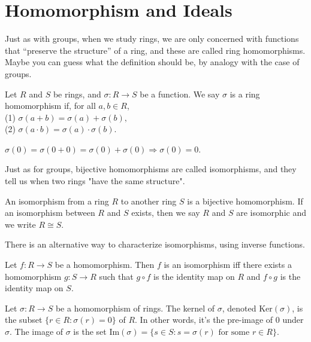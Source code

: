 \newcommand{\gi}[1]{\langle #1 \rangle}
\chapter{Homomorphism and Ideals}\label{chp:4_2}

Just as with groups, when we study rings, we are only concerned with functions that “preserve the
structure” of a ring, and these are called ring homomorphisms. Maybe you can guess what the definition
should be, by analogy with the case of groups.

\begin{definition}{}{}
    Let $R$ and $S$ be rings, and $\sigma:R\rightarrow S$ be a function. We say $\sigma$ is a ring homomorphism if, for all $a,b\in R$, \\
    (1) $\sigma (a+b)=\sigma(a)+\sigma(b),$\\
    (2) $\sigma(a\cdot b)=\sigma(a)\cdot \sigma(b)$.
\end{definition}

\begin{remark}
    $\sigma(0) =\sigma(0+0)=\sigma(0)+\sigma(0)\Rightarrow \sigma(0)=0$.
\end{remark}

Just as for groups, bijective homomorphisms are called isomorphisms, and they tell us when two rings
"have the same structure".

\begin{definition}{}{}
    An isomorphism from a ring $R$ to another ring $S$ is a bijective homomorphism. If an isomorphism between $R$ and $S$ exists, 
    then we say $R$ and $S$ are isomorphic and we write $R\cong S$.
\end{definition}

There is an alternative way to characterize isomorphisms, using inverse functions.

\begin{proposition}{}{}
    Let $f:R\rightarrow S$ be a homomorphism. Then $f$ is an isomorphism iff there exists a homomorphism $g:S\rightarrow R$ such that $g\circ f$ is the identity map on $R$ 
    and $f\circ g$ is the identity map on $S$.
\end{proposition}

\begin{definition}{}{}
    Let $\sigma:R\rightarrow S$ be a homomorphism of rings. The kernel of $\sigma$, denoted $\text{Ker}(\sigma)$, 
    is the subset $\{r\in R:\sigma(r)=0\}$ of $R$. In other words, it's the pre-image of $0$ under $\sigma$.
    The image of $\sigma$ is the set $\text{Im}(\sigma)=\{s\in S:s=\sigma(r) \text{ for some } r\in R\}$.
\end{definition}

